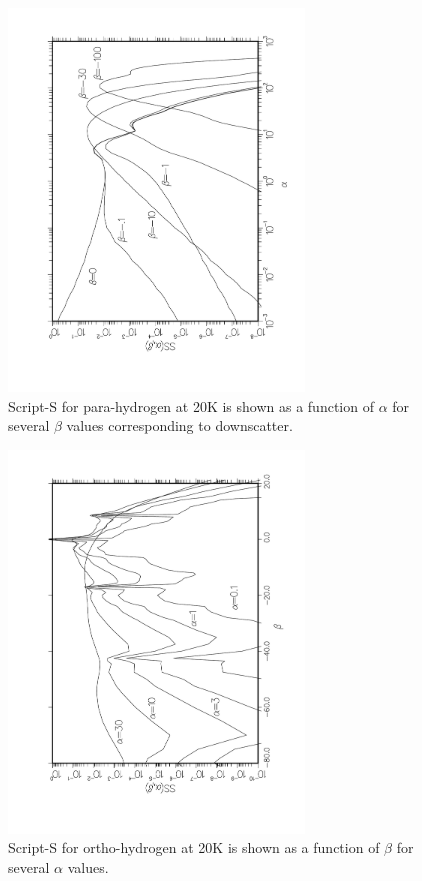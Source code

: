 \begin{figure}[tp]\centering
\includegraphics[keepaspectratio, height=4.0in, angle=270]{figs/le11back}
\caption[script-S vs alpha for para-hydrogen]{Script-S for para-hydrogen
 at 20K is shown as a function of $\alpha$ for several $\beta$ values
 corresponding to downscatter.}
\label{fig11b}
\end{figure}

\begin{figure}[bp]\centering
\includegraphics[keepaspectratio, height=4.0in, angle=270]{figs/le12aack}
\caption[script-S vs beta for ortho-hydrogen]{Script-S for ortho-hydrogen at
 20K is shown as a function of $\beta$ for several $\alpha$ values.}
\label{fig12a}
\end{figure}


